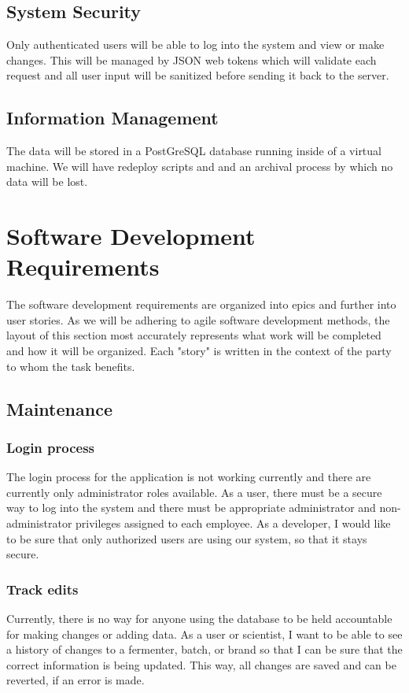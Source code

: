 \documentclass[draftclsnofoot,onecolumn,journal,letterpaper,compsoc,10pt]{IEEEtran}
\begin{document}
    \subsection{System Security}
    Only authenticated users will be able to log into the system and view or make changes. This will be managed by JSON web tokens which will validate each request and all user input will be sanitized before sending it back to the server.
    \subsection{Information Management}
    The data will be stored in a PostGreSQL database running inside of a virtual machine. We will have redeploy scripts and and an archival process by which no data will be lost.
\section{Software Development Requirements}
        The software development requirements are organized into epics and further into user stories. As we will be adhering to agile software development methods, the layout of this section most accurately represents what work will be completed and how it will be organized. Each "story" is written in the context of the party to whom the task benefits.
    \subsection{Maintenance}
        \subsubsection{Login process}
        The login process for the application is not working currently and there are currently only administrator roles available. As a user, there must be a secure way to log into the system and there must be appropriate administrator and non-administrator privileges assigned to each employee. As a developer, I would like to be sure that only authorized users are using our system, so that it stays secure. 
        \subsubsection{Track edits}
            Currently, there is no way for anyone using the database to be held accountable for making changes or adding data. As a user or scientist, I want to be able to see a history of changes to a fermenter, batch, or brand so that I can be sure that the correct information is being updated. This way, all changes are saved and can be reverted, if an error is made. 
\end{document}
